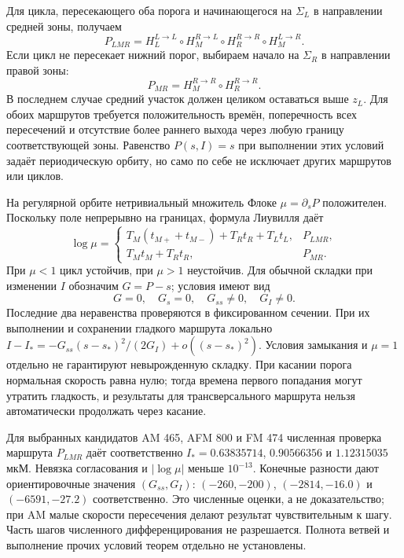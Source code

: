 Для цикла, пересекающего оба порога и начинающегося на $\Sigma_L$ в направлении средней зоны, получаем
\begin{equation}\label{eq:return-both}
P_{LMR}=H_L^{L\to L}\circ H_M^{R\to L}\circ
H_R^{R\to R}\circ H_M^{L\to R}.
\end{equation}
Если цикл не пересекает нижний порог, выбираем начало на $\Sigma_R$ в направлении правой зоны:
\begin{equation}\label{eq:return-upper}
P_{MR}=H_M^{R\to R}\circ H_R^{R\to R}.
\end{equation}
В последнем случае средний участок должен целиком оставаться выше $z_L$. Для обоих маршрутов требуется положительность времён, поперечность всех пересечений и отсутствие более раннего выхода через любую границу соответствующей зоны. Равенство $P(s,I)=s$ при выполнении этих условий задаёт периодическую орбиту, но само по себе не исключает других маршрутов или циклов.

На регулярной орбите нетривиальный множитель Флоке $\mu=\partial_sP$ положителен. Поскольку поле непрерывно на границах, формула Лиувилля даёт
\begin{equation}\label{eq:return-multiplier}
\log\mu=\begin{cases}
 T_M(t_{M+}+t_{M-})+T_Rt_R+T_Lt_L,& P_{LMR},\\
 T_Mt_M+T_Rt_R,& P_{MR}.
\end{cases}
\end{equation}
При $\mu<1$ цикл устойчив, при $\mu>1$ неустойчив. Для обычной складки при изменении $I$ обозначим $G=P-s$; условия имеют вид
\begin{equation}\label{eq:return-fold}
G=0,\quad G_s=0,\quad G_{ss}\ne0,\quad G_I\ne0.
\end{equation}
Последние два неравенства проверяются в фиксированном сечении. При их выполнении и сохранении гладкого маршрута локально $I-I_*=-G_{ss}(s-s_*)^2/(2G_I)+o((s-s_*)^2)$. Условия замыкания и $\mu=1$ отдельно не гарантируют невырожденную складку. При касании порога нормальная скорость равна нулю; тогда времена первого попадания могут утратить гладкость, и результаты для трансверсального маршрута нельзя автоматически продолжать через касание.

Для выбранных кандидатов AM 465, AFM 800 и FM 474 численная проверка маршрута $P_{LMR}$ даёт соответственно $I_*=0.63835714$, $0.90566356$ и $1.12315035$ мкМ. Невязка согласования и $|\log\mu|$ меньше $10^{-13}$. Конечные разности дают ориентировочные значения $(G_{ss},G_I)$: $(-260,-200)$, $(-2814,-16.0)$ и $(-6591,-27.2)$ соответственно. Это численные оценки, а не доказательство; при AM малые скорости пересечения делают результат чувствительным к шагу. Часть шагов численного дифференцирования не разрешается. Полнота ветвей и выполнение прочих условий теорем отдельно не установлены.

